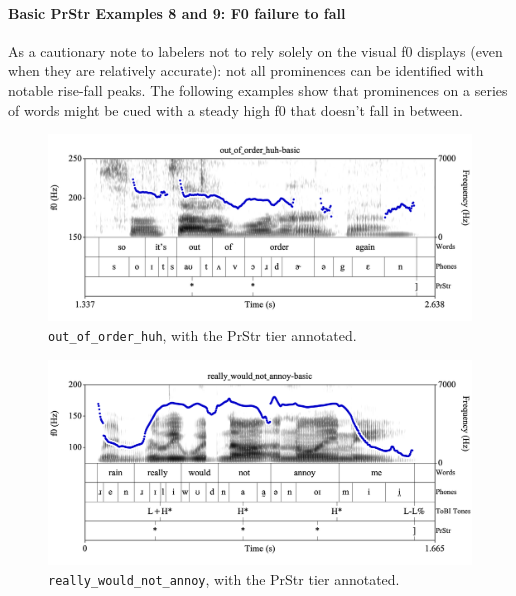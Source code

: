 \documentclass[11pt, twoside]{memoir}
\begin{document}
\paragraph{Basic PrStr Examples 8 and 9: F0 failure to fall}
As a cautionary note to labelers not to rely solely on the visual f0 displays (even when they are relatively accurate): not all prominences can be identified with notable rise-fall peaks. The following examples show that prominences on a series of words might be cued with a steady high f0 that doesn’t fall in between. 
\begin{figure}[H]
\centering
\includegraphics[width=.875\linewidth]{PrStr-out_of_order_huh-basic.png}
\caption{\texttt{out\_of\_order\_huh}, with the PrStr tier annotated.
\label{fig:out_of_order_huh PrStr}
}
\end{figure}
\begin{figure}[H]
\centering
\includegraphics[width=.875\linewidth]{PrStr-really_would_not_annoy-basic.png}
\caption{\texttt{really\_would\_not\_annoy}, with the PrStr tier annotated.
\label{fig:really_would_not_annoy PrStr}
}
\end{figure}
\end{document}
